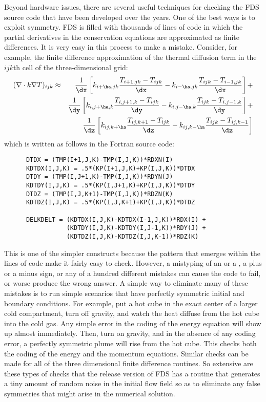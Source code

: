 \documentclass[11pt]{book}
\begin{document}
Beyond hardware issues, there are several useful techniques for checking the FDS source code that have been developed over the years. One of the
best ways is to exploit symmetry. FDS is filled with thousands of lines of code in which the partial derivatives in the conservation equations are
approximated as finite differences. It is very easy in this process to make a mistake. Consider, for example, the finite difference approximation of
the thermal diffusion term in the $ijk$th cell of the three-dimensional grid:
\begin{eqnarray*}
(\nabla \cdot k \nabla T)_{ijk} &\approx&
              \frac{1}{\dx}
         \left[k_{i+\ha,jk}\frac{T_{i+1,jk}-T_{ijk}}{\dx}
              -k_{i-\ha,jk}\frac{T_{ijk}-T_{i-1,jk}}{\dx}\right]+  \nonumber \\
            &&\frac{1}{\dy}
         \left[k_{i,j+\ha,k}\frac{T_{i,j+1,k}-T_{ijk}}{\dy}
              -k_{i,j-\ha,k}\frac{T_{ijk}-T_{i,j-1,k}}{\dy}\right]+ \nonumber \\
            &&\frac{1}{\dz}
         \left[k_{ij,k+\ha}\frac{T_{ij,k+1}-T_{ijk}}{\dz}
              -k_{ij,k-\ha}\frac{T_{ijk}-T_{ij,k-1}}{\dz}\right]
\end{eqnarray*}
which is written as follows in the Fortran source code:
\begin{lstlisting}
      DTDX = (TMP(I+1,J,K)-TMP(I,J,K))*RDXN(I)
      KDTDX(I,J,K) = .5*(KP(I+1,J,K)+KP(I,J,K))*DTDX
      DTDY = (TMP(I,J+1,K)-TMP(I,J,K))*RDYN(J)
      KDTDY(I,J,K) = .5*(KP(I,J+1,K)+KP(I,J,K))*DTDY
      DTDZ = (TMP(I,J,K+1)-TMP(I,J,K))*RDZN(K)
      KDTDZ(I,J,K) = .5*(KP(I,J,K+1)+KP(I,J,K))*DTDZ

      DELKDELT = (KDTDX(I,J,K)-KDTDX(I-1,J,K))*RDX(I) +
                 (KDTDY(I,J,K)-KDTDY(I,J-1,K))*RDY(J) +
                 (KDTDZ(I,J,K)-KDTDZ(I,J,K-1))*RDZ(K)
\end{lstlisting}
This is one of the simpler constructs because the pattern that emerges within the lines of code make it fairly easy to check. However, a mistyping
of an  or a , a plus or a minus sign, or any of a hundred different mistakes can cause the code to fail, or worse produce the wrong
answer. A simple way to eliminate many of these mistakes is to run simple scenarios that have perfectly symmetric initial and boundary conditions.
For example, put a hot cube in the exact center of a larger cold compartment, turn off gravity, and watch the heat diffuse from the hot cube into the
cold gas. Any simple error in the coding of the energy equation will show up almost immediately. Then, turn on gravity, and in the absence of any
coding error, a perfectly symmetric plume will rise from the hot cube. This checks both the coding of the energy and the momentum equations. Similar
checks can be made for all of the three dimensional finite difference routines. So extensive are these types of checks that the release version of
FDS has a routine that generates a tiny amount of random noise in the initial flow field so as to eliminate any false symmetries that might arise in
the numerical solution.
\end{document}
